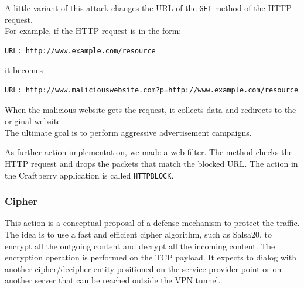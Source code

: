 \documentclass[12pt]{article}
\begin{document}
	\bigbreak
	A little variant of this attack changes the URL of the \lstinline{GET} method of the HTTP request.\\
	For example, if the HTTP request is in the form:\\
	
	\bigbreak
	\begin{lstlisting}[frame=single]
		URL: http://www.example.com/resource
	\end{lstlisting}
	\bigbreak
	
	it becomes
	
	\bigbreak
	\begin{lstlisting}[frame=single]
		URL: http://www.maliciouswebsite.com?p=http://www.example.com/resource
	\end{lstlisting}
	\bigbreak
	
	When the malicious website gets the request, it collects data and redirects to the original website.\\
	The ultimate goal is to perform aggressive advertisement campaigns.\\
	\bigbreak

	As further action implementation, we made a web filter. The method checks the HTTP request and drops the packets that match the blocked URL. The action in the Craftberry application is called \lstinline{HTTPBLOCK}.

	\subsubsection{Cipher}

	This action is a conceptual proposal of a defense mechanism to protect the traffic. The idea is to use a fast and efficient cipher algorithm, such as Salsa20, to encrypt all the outgoing content and decrypt all the incoming content. The encryption operation is performed on the TCP payload. It expects to dialog with another cipher/decipher entity positioned on the service provider point or on another server that can be reached outside the VPN tunnel.\\
	\bigbreak
\end{document}
